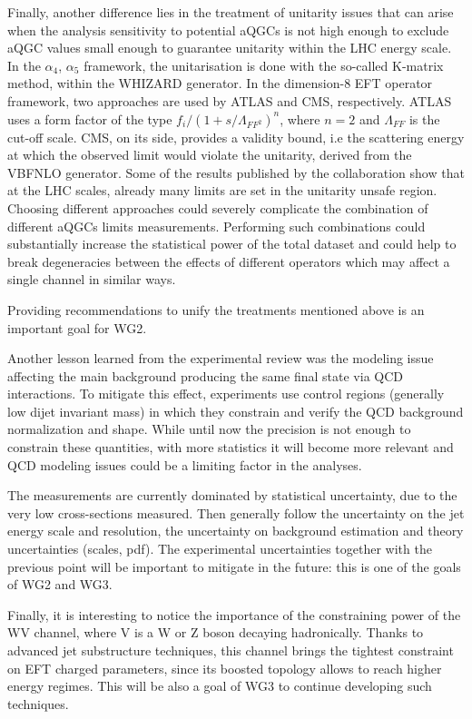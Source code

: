 Finally, another difference lies in the treatment of unitarity issues that can arise when the analysis sensitivity to potential aQGCs is not high enough to exclude aQGC values small enough to guarantee unitarity within the LHC energy scale. In the $\alpha_4$, $\alpha_5$ framework, the unitarisation is done with the so-called K-matrix method, within the WHIZARD generator. In the dimension-8 EFT operator framework, two approaches are used by ATLAS and CMS, respectively. ATLAS uses a form factor of the type $f_i/(1+s/\Lambda_{FF^2})^n$, where $n=2$ and $\Lambda_{FF}$ is the cut-off scale. CMS, on its side, provides a validity bound, i.e the scattering energy at which the observed limit would violate the unitarity, derived from the VBFNLO generator. Some of the results published by the collaboration show that at the LHC scales, already many limits are set in the unitarity unsafe region. 
Choosing different approaches could severely complicate the combination of different aQGCs limits measurements. Performing such combinations could substantially increase the statistical power of the total dataset and could help to break degeneracies between the effects of different operators which may affect a single channel in similar ways.

Providing recommendations to unify the treatments mentioned above is an important goal for WG2. 

Another lesson learned from the experimental review was the modeling issue affecting the main background producing the same final state via QCD interactions. To mitigate this effect, experiments use control regions (generally low dijet invariant mass) in which they constrain and verify the QCD background normalization and shape. While until now the precision is not enough to constrain these quantities, with more statistics it will become more relevant and QCD modeling issues could be a limiting factor in the analyses.

The measurements are currently dominated by statistical uncertainty, due to the very low cross-sections measured. Then generally follow the uncertainty on the jet energy scale and resolution, the uncertainty on background estimation and theory uncertainties (scales, pdf). The experimental uncertainties together with the previous point will be  important to mitigate in the future: this is one of the goals of WG2 and WG3.
 
Finally, it is interesting to notice the importance of the constraining power of the WV channel, where V is a W or Z boson decaying hadronically. Thanks to advanced jet substructure techniques, this channel brings the tightest constraint on EFT charged parameters, since its boosted topology allows to reach higher energy regimes. This will be also a goal of WG3 to continue developing such techniques. 
